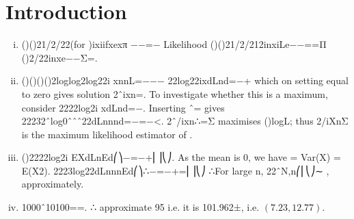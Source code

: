 \documentclass{article}
\author{kobriendublin }
\date{December 2018}
\begin{document}
\section{Introduction}
\begin{enumerate}[(i)]
\item 
 ()()21/2/22(for )ixiifxex\theta π \theta−−=−
Likelihood ()(){}21/2/212inxiLe\theta{}\theta−−==Π ()2/22inxe\theta−−Σ=.
\item  ()()()()2loglog2log22i xnnL\theta{}=−−− 22log22ixdLnd\theta\theta{}=−+ which on setting equal to zero gives solution 2ˆixn=.
To investigate whether this is a maximum, consider 2222log2i xdLnd\theta\theta{}=−.
Inserting ˆ\theta\theta= gives 22232ˆlog0ˆˆˆ22dLnnnd\theta\theta\theta\theta\theta=−=−<.
2ˆ/ixn\theta∴=Σ maximises ()logL\theta; thus 2/iXnΣ is the maximum likelihood estimator of \theta.
\item  ()2222log2i EXdLnEd\theta\theta{}⎛⎞−=−+⎜⎟⎝⎠.
As the mean is 0, we have \theta = Var(X) = E(X2). 2223log22dLnnnEd\theta \theta\theta\theta\theta⎛⎞∴−=−+=⎜⎟⎝⎠
∴For large n, 22ˆN,n\theta\theta\theta⎛⎜⎝⎠∼ , approximately.
\item  1000ˆ10100\theta==.
∴ approximate 95%
i.e. it is 101.962±, i.e. $(7.23, 12.77)$.
\end{enumerate}
\end{document}
